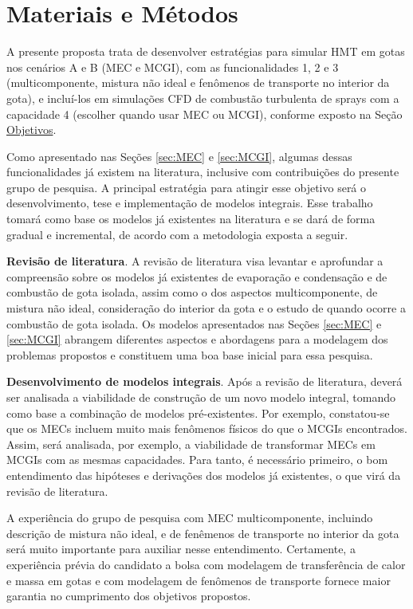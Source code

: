 

\section{Materiais e Métodos} \label{sec:metod}

A presente proposta trata de desenvolver estratégias para simular HMT em gotas nos cenários {A} e {B} (MEC e MCGI), com as funcionalidades {1}, {2} e {3} (multicomponente, mistura não ideal e fenômenos de transporte no interior da gota), e incluí-los em simulações CFD de combustão turbulenta de sprays com a capacidade 4 (escolher quando usar MEC ou MCGI), conforme exposto na Seção \hyperref[sec:objetivos]{Objetivos}.

Como apresentado nas Seções \ref{sec:MEC} e \ref{sec:MCGI}, algumas dessas funcionalidades já existem na literatura, inclusive com contribuições do presente grupo de pesquisa.
A principal estratégia para atingir esse objetivo será o desenvolvimento, tese e implementação de modelos integrais. Esse trabalho tomará como base os modelos já existentes na literatura e se dará de forma gradual e incremental, de acordo com a metodologia exposta a seguir.

\textbf{Revisão de literatura}. 
A revisão de literatura visa levantar e aprofundar a compreensão sobre os modelos já  existentes de evaporação e condensação e de combustão de gota isolada, assim como o dos aspectos multicomponente, de mistura não ideal, consideração do interior da gota e o estudo de quando ocorre a combustão de gota isolada.
Os modelos apresentados nas Seções \ref{sec:MEC} e \ref{sec:MCGI} abrangem diferentes aspectos e abordagens para a modelagem dos problemas propostos e constituem uma boa base inicial para essa pesquisa. 

\textbf{Desenvolvimento de modelos integrais}.
Após a revisão de literatura, deverá ser analisada a viabilidade de construção de um novo modelo integral, tomando como base a combinação de modelos pré-existentes.
Por exemplo, constatou-se que os MECs incluem muito mais fenômenos físicos do que o MCGIs encontrados. 
Assim, será analisada, por exemplo, a viabilidade de transformar MECs em MCGIs com as mesmas capacidades.
Para tanto, é necessário primeiro, o bom entendimento das hipóteses e derivações dos modelos já existentes, o que virá da revisão de literatura.   

A experiência do grupo de pesquisa com MEC multicomponente, incluindo descrição de mistura não ideal, e de fenêmenos de transporte no interior da gota será muito importante para auxiliar nesse entendimento.
Certamente, a experiência prévia do candidato a bolsa com modelagem de transferência de calor e massa em gotas \cite{HenningsJ2024MT} e com modelagem de fenômenos de transporte \cite{HenningsJ2023BT,DokozaT2024,DokozaT2025,DeBroeckL2025} fornece maior garantia no cumprimento dos objetivos propostos. %

